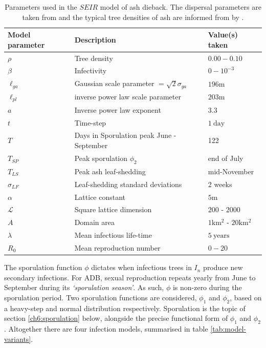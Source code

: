 \begin{table}[h]
\centering
\begin{tabular}{l l l}
\hline
\textbf{Model parameter} & \textbf{Description} & \textbf{Value(s) taken}\\
\hline
$\rho$  & Tree density & $0.00 - 0.10$ \\ 
$\beta$ & Infectivity & $0 - 10^{-3}$ \\
$\ell_{ga}$ & Gaussian scale parameter $=\sqrt{2}\sigma_{ga}$ & $196\mathrm{m}$ \\
$\ell_{pl}$ & inverse power law scale parameter & $203\mathrm{m}$ \\
$a$ & Inverse power law exponent & $3.3$ \\
$t$ & Time-step & $1\ \mathrm{day}$\\
$T$ & Days in Sporulation peak June - September & 122  \\
$T_{SP}$ & Peak sporulation $\phi_2$ & end of July \\
$T_{LS}$ & Peak ash leaf-shedding & mid-November \\
$\sigma_{LF}$ & Leaf-shedding standard deviations & 2 weeks \\
$\alpha$ & Lattice constant & $5\mathrm{m}$ \\
$\mathcal{L}$ & Square lattice dimension & $200$ - $2000$ \\
$A$ & Domain area & $1\mathrm{km^2}$ - $20\mathrm{km^2}$ \\
$\lambda$ & Mean infectious life-time & $5\ \mathrm{years}$ \\
$R_0$ & Mean reproduction number & $0-20$ \\
\hline
\end{tabular}
\caption{Parameters used in the $SEIR$ model of ash dieback. The dispersal parameters are taken from \cite{grosdidier2018tracking} and the typical tree densities of ash are informed from by \cite{hill.data}.}
\label{tab:SEIR-model}
\end{table}

The sporulation function $\phi$ dictates when infectious trees in $I_n$ produce new secondary infections. 
For ADB, sexual reproduction repeats yearly from June to September during its \textit{`sporulation season'}.
As such, $\phi$ is non-zero during the sporulation period.
Two sporulation functions are considered, $\phi_1$ and $\phi_2$, based on a heavy-step and normal distribution respectively.
Sporulation is the topic of section \ref{ch6:sporulation} below, alongside the precise functional form of $\phi_1$ and $\phi_2$.
Altogether there are four infection models, summarised in table \ref{tab:model-variants}.

